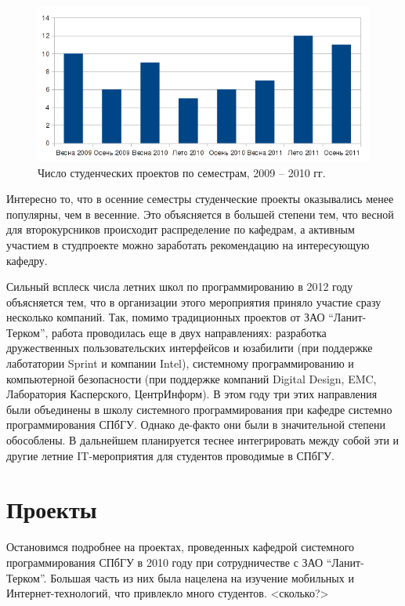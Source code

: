 \documentclass[a5paper]{article}
\begin{document}
\begin{figure} [ht]
  \begin{center}
    \includegraphics[width=1\textwidth]{01-projects.png}
    \caption{Число студенческих проектов по семестрам, 2009 – 2010 гг.}
    \label{projects}
  \end{center}
\end{figure}

Интересно то, что в осенние семестры студенческие проекты оказывались менее популярны, чем в весенние. Это объясняется в большей степени тем, что весной для второкурсников происходит распределение по кафедрам, а активным участием в студпроекте можно заработать рекомендацию на интересующую кафедру. 

Сильный всплеск числа летних школ по программированию в 2012 году объясняется тем, что в организации этого мероприятия приняло участие сразу несколько компаний. Так, помимо традиционных проектов от ЗАО “Ланит-Терком”, работа проводилась еще в двух направлениях: разработка дружественных пользовательских интерфейсов и юзабилити (при поддержке лаботатории Sprint и компании Intel), системному программированию и компьютерной безопасности (при поддержке компаний Digital Design, EMC, Лаборатория Касперского, ЦентрИнформ). В этом году три этих направления были объединены в школу системного программирования при кафедре системно программирования СПбГУ. Однако де-факто они были в значительной степени обособлены. В дальнейшем планируется теснее интегрировать между собой эти и другие летние IT-мероприятия для студентов проводимые в СПбГУ. 

\section{Проекты}

Остановимся подробнее на проектах, проведенных кафедрой системного программирования СПбГУ в 2010 году при сотрудничестве с ЗАО ``Ланит-Терком''. Большая часть из них была нацелена на изучение мобильных и Интернет-технологий, что привлекло много студентов. <сколько?>
\end{document}
